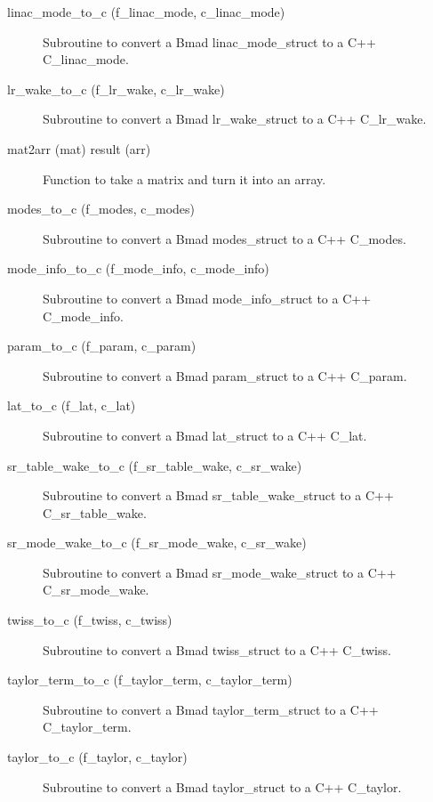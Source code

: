 \begin{description}
\item[linac_mode_to_c (f_linac_mode, c_linac_mode)] \Newline 
Subroutine to convert a Bmad linac_mode_struct to a C++ C_linac_mode.

\item[lr_wake_to_c (f_lr_wake, c_lr_wake)] \Newline 
Subroutine to convert a Bmad lr_wake_struct to a C++ C_lr_wake.

\item[mat2arr (mat) result (arr)] \Newline 
Function to take a matrix and turn it into an array.

\item[modes_to_c (f_modes, c_modes)] \Newline 
Subroutine to convert a Bmad modes_struct to a C++ C_modes.

\item[mode_info_to_c (f_mode_info, c_mode_info)] \Newline 
Subroutine to convert a Bmad mode_info_struct to a C++ C_mode_info.

\item[param_to_c (f_param, c_param)] \Newline 
Subroutine to convert a Bmad param_struct to a C++ C_param.

\item[lat_to_c (f_lat, c_lat)] \Newline 
Subroutine to convert a Bmad lat_struct to a C++ C_lat.

\item[sr_table_wake_to_c (f_sr_table_wake, c_sr_wake)] \Newline 
Subroutine to convert a Bmad sr_table_wake_struct to a C++ C_sr_table_wake.

\item[sr_mode_wake_to_c (f_sr_mode_wake, c_sr_wake)] \Newline 
Subroutine to convert a Bmad sr_mode_wake_struct to a C++ C_sr_mode_wake.

\item[twiss_to_c (f_twiss, c_twiss)] \Newline 
Subroutine to convert a Bmad twiss_struct to a C++ C_twiss.

\item[taylor_term_to_c (f_taylor_term, c_taylor_term)] \Newline 
Subroutine to convert a Bmad taylor_term_struct to a C++ C_taylor_term.

\item[taylor_to_c (f_taylor, c_taylor)] \Newline 
Subroutine to convert a Bmad taylor_struct to a C++ C_taylor.


\end{description}
